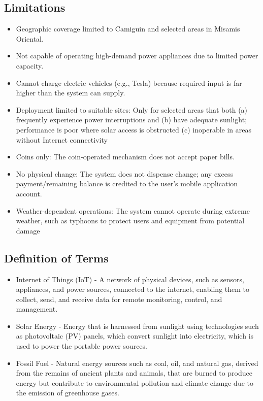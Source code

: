 {\subsection{Limitations}
	\begin{itemize}
		\item  Geographic coverage limited to Camiguin and selected areas in Misamis Oriental.
		\item  Not capable of operating high-demand power appliances due to limited power capacity.
		\item Cannot charge electric vehicles (e.g., Tesla) because required input is far higher than the system can supply.
		\item Deployment limited to suitable sites: Only for selected areas that both (a) frequently experience power interruptions and (b) have adequate sunlight; performance is poor where solar access is obstructed (c) inoperable in areas without Internet connectivity
		\item Coins only: The coin-operated mechanism does not accept paper bills.
		\item No physical change: The system does not dispense change; any excess payment/remaining balance is credited to the user’s mobile application account.
		\item Weather-dependent operations: The system cannot operate during extreme weather, such as typhoons to protect users and equipment from potential damage
	\end{itemize}

\subsection{Definition of Terms}


\begin{itemize}
	\item Internet of Things (IoT) - A network of physical devices, such as sensors, appliances, and power sources, connected to the internet, enabling them to collect, send, and receive data for remote monitoring, control, and management.
	
	\item Solar Energy - Energy that is harnessed from sunlight using technologies such as photovoltaic (PV) panels, which convert sunlight into electricity, which is used to power the portable power sources.
	
	\item Fossil Fuel - Natural energy sources such as coal, oil, and natural gas, derived from the remains of ancient plants and animals, that are burned to produce energy but contribute to environmental pollution and climate change due to the emission of greenhouse gases.
	

\end{itemize}}
